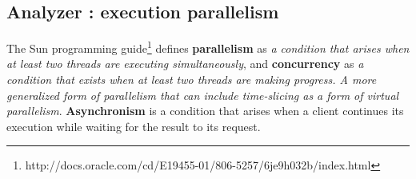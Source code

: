 
\subsection{Analyzer : execution parallelism} \label{section:analyzer}

The Sun programming guide\footnote{\raggedright http://docs.oracle.com/cd/E19455-01/806-5257/6je9h032b/index.html} defines \textbf{parallelism} as \textit{a condition that arises when at least two threads are executing simultaneously}, and \textbf{concurrency} as \textit{a condition that exists when at least two threads are making progress. A more generalized form of parallelism that can include time-slicing as a form of virtual parallelism}.
\textbf{Asynchronism} is a condition that arises when a client continues its execution while waiting for the result to its request.





